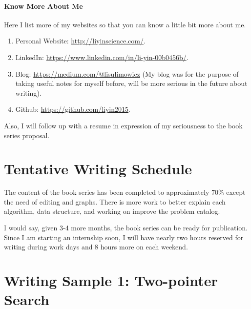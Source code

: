 \documentclass[12pt]{article}
\begin{document}
\paragraph{Know More About Me} Here I list more of my websites so that you can know a little bit more about me.
\begin{enumerate}
    \item Personal Website: \url{http://liyinscience.com/}.
    \item LinkedIn: \url{https://www.linkedin.com/in/li-yin-00b0456b/}.
    \item Blog: \url{https://medium.com/@lisulimowicz} (My blog was for the purpose of taking useful notes for myself before, will be more serious in the future about writing). 
    \item Github: \url{https://github.com/liyin2015}.
\end{enumerate}
    

Also, I will follow up with a resume in expression of my seriousness to the book series proposal. 
\section{Tentative Writing Schedule}

The content of the book series has been completed to approximately 70\% except the need of editing and graphs. There is more work to better explain each algorithm, data structure, and working on improve the problem catalog. 

I would say, given 3-4 more months, the book series can be ready for publication. Since I am starting an internship soon, I will have nearly two hours reserved for writing during work days and 8 hours more on each weekend. 
\section{Writing Sample 1: Two-pointer Search}



% 
\end{document}
